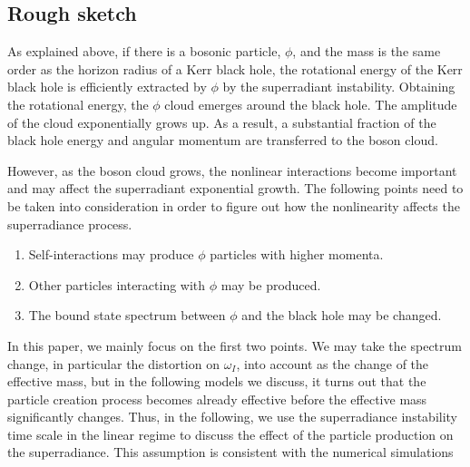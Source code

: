 \documentclass[%
 preprint,
 nofootinbib,
 amsmath,amssymb,
 aps,
 a4paper
]{revtex4-1}
\begin{document}
\subsection{Rough sketch}


As explained above, if there is a bosonic particle, $\phi$, and the mass is the same order as the horizon radius of a Kerr black hole, the rotational energy of the Kerr black hole is efficiently extracted by $\phi$ by the superradiant instability. Obtaining the rotational energy, the $\phi$ cloud emerges around the black hole. The amplitude of the cloud exponentially grows up. 
As a result, a substantial fraction of the black hole energy and angular momentum are transferred to the boson cloud.

However, as the boson cloud grows, the nonlinear interactions become important and may affect the superradiant exponential growth. The following  points need to be taken into consideration in order to figure out how the nonlinearity affects the superradiance process.
\begin{enumerate}
    \item Self-interactions may produce $\phi$ particles with higher momenta.
    \item Other particles interacting with $\phi$ may be produced.
    \item The bound state spectrum between $\phi$ and the black hole may be changed.
\end{enumerate}
In this paper, we mainly focus on the first two points. We may take the spectrum change, in particular the distortion on $\omega_I$, into account as the change of the effective mass, but in the following models we discuss, it turns out that the particle creation process becomes already effective before the effective mass significantly changes. Thus, in the following, we use the superradiance instability time scale in the linear regime to discuss the effect of the particle production on the superradiance. This assumption is consistent with the numerical simulations\,\cite{Yoshino:2012kn,Yoshino:2013ofa}
\end{document}
